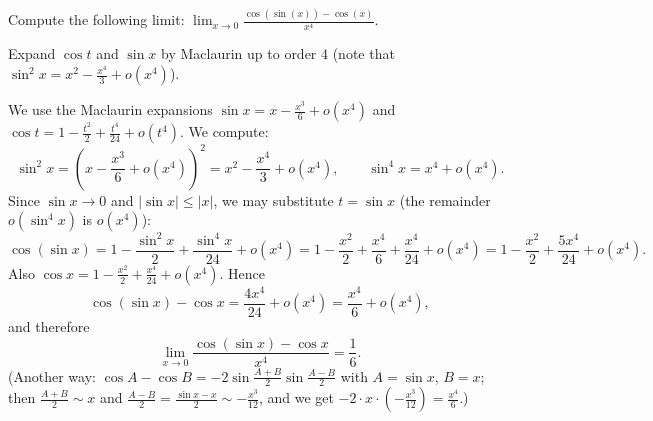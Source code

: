 
\begin{question}
Compute the following limit: $\lim_{x\to0}\frac{\cos(\sin(x))-\cos(x)}{x^4}$.
\end{question}

\begin{hint}
Expand $\cos t$ and $\sin x$ by Maclaurin up to order $4$ (note that $\sin^2x=x^2-\frac{x^4}{3}+o(x^4)$).
\end{hint}

\begin{solution}
We use the Maclaurin expansions
$\sin x=x-\frac{x^3}{6}+o(x^4)$ and $\cos t=1-\frac{t^2}{2}+\frac{t^4}{24}+o(t^4)$.
We compute:
\[ \sin^2x=\left(x-\frac{x^3}{6}+o(x^4)\right)^2=x^2-\frac{x^4}{3}+o(x^4),\qquad \sin^4x=x^4+o(x^4). \]
Since $\sin x\to0$ and $|\sin x|\le|x|$, we may substitute $t=\sin x$ (the remainder $o(\sin^4x)$ is $o(x^4)$):
\[ \cos(\sin x)=1-\frac{\sin^2x}{2}+\frac{\sin^4x}{24}+o(x^4)=1-\frac{x^2}{2}+\frac{x^4}{6}+\frac{x^4}{24}+o(x^4)=1-\frac{x^2}{2}+\frac{5x^4}{24}+o(x^4). \]
Also $\cos x=1-\frac{x^2}{2}+\frac{x^4}{24}+o(x^4)$. Hence
\[ \cos(\sin x)-\cos x=\frac{4x^4}{24}+o(x^4)=\frac{x^4}{6}+o(x^4), \]
and therefore
\[ \lim_{x\to0}\frac{\cos(\sin x)-\cos x}{x^4}=\boxed{\frac16}. \]
(Another way: $\cos A-\cos B=-2\sin\frac{A+B}{2}\sin\frac{A-B}{2}$ with $A=\sin x$, $B=x$; then $\frac{A+B}{2}\sim x$ and $\frac{A-B}{2}=\frac{\sin x-x}{2}\sim-\frac{x^3}{12}$, and we get $-2\cdot x\cdot(-\frac{x^3}{12})=\frac{x^4}{6}$.)
\end{solution}
